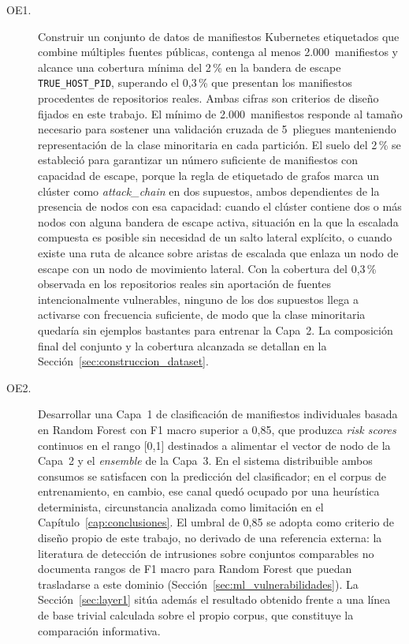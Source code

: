 \begin{description}
  \item[OE1.] Construir un conjunto de datos de manifiestos Kubernetes
    etiquetados que combine múltiples fuentes públicas, contenga al menos
    2.000~manifiestos y alcance una cobertura mínima del 2\,\% en la bandera de escape
    \texttt{TRUE\_HOST\_PID}, superando el 0,3\,\% que presentan los manifiestos
    procedentes de repositorios reales. Ambas cifras son criterios de diseño
    fijados en este trabajo. El mínimo de 2.000~manifiestos responde al tamaño
    necesario para sostener una validación cruzada de 5~pliegues manteniendo
    representación de la clase minoritaria en cada partición. El suelo del 2\,\%
    se estableció para garantizar un número suficiente de manifiestos con
    capacidad de escape, porque la regla de etiquetado de grafos marca un clúster
    como \textit{attack\_chain} en dos supuestos, ambos dependientes de la
    presencia de nodos con esa capacidad: cuando el clúster contiene dos o más
    nodos con alguna bandera de escape activa, situación en la que la escalada
    compuesta es posible sin necesidad de un salto lateral explícito, o cuando
    existe una ruta de alcance sobre aristas de escalada que enlaza un nodo de
    escape con un nodo de movimiento lateral. Con la cobertura del 0,3\,\% observada en los
    repositorios reales sin aportación de fuentes intencionalmente vulnerables,
    ninguno de los dos supuestos llega a activarse con frecuencia suficiente, de
    modo que la clase minoritaria quedaría sin ejemplos bastantes para entrenar la
    Capa~2. La composición final del
    conjunto y la cobertura alcanzada se detallan en la
    Sección~\ref{sec:construccion_dataset}.

  \item[OE2.] Desarrollar una Capa~1 de clasificación de manifiestos individuales
    basada en Random Forest con F1 macro superior a 0,85, que produzca
    \textit{risk scores} continuos en el rango [0,1] destinados a alimentar el
    vector de nodo de la Capa~2 y el \textit{ensemble} de la Capa~3. En el sistema
    distribuible ambos consumos se satisfacen con la predicción del clasificador;
    en el corpus de entrenamiento, en cambio, ese canal quedó ocupado por una
    heurística determinista, circunstancia analizada como limitación en el
    Capítulo~\ref{cap:conclusiones}. El umbral de 0,85 se adopta como criterio de diseño
    propio de este trabajo, no derivado de una referencia externa: la literatura
    de detección de intrusiones sobre conjuntos comparables no documenta rangos de
    F1 macro para Random Forest que puedan trasladarse a este dominio
    (Sección~\ref{sec:ml_vulnerabilidades}). La Sección~\ref{sec:layer1} sitúa
    además el resultado obtenido frente a una línea de base trivial calculada
    sobre el propio corpus, que constituye la comparación informativa.


\end{description}
